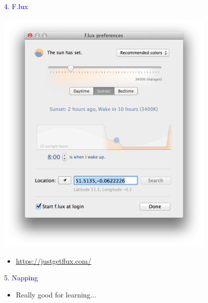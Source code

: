 \documentclass[landscape]{slides}
\begin{document}
\begin{slide}

    \textcolor{blue}{\Large{4. F.lux}}

    \begin{center}
        \includegraphics[height=12cm]{flux}
    \end{center}

    \begin{itemize}
        \item \url{https://justgetflux.com/}
    \end{itemize}

\end{slide}


\begin{slide}

    \textcolor{blue}{\Large{5. Napping}}

    \begin{itemize}
        \item Really good for learning...
    \end{itemize}

\end{slide}
\end{document}
